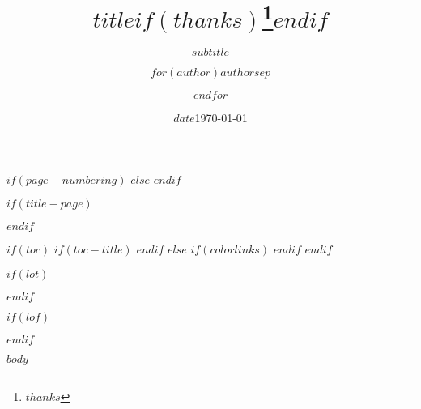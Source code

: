\documentclass[
$if(page-size)$
  $page-size$paper,
$else$
  a4paper,
$endif$
$if(fontsize)$
  $font-size$,
$else$
  10pt,
$endif$
$if(lang)$
  $babel-lang$,
$endif$
$if(draft)$
  draft,
$endif$
  parskip=half
]{scrartcl}
\title{$title$$if(thanks)$\thanks{$thanks$}$endif$}
\subtitle{$subtitle$}
\author{$for(author)$$author$$sep$ \and $endfor$}
\date{$date$}
\date{\today}
\begin{document}
$if(page-numbering)$
$else$
$endif$

$if(title-page)$
  \maketitle
  \pagebreak
$endif$

$if(toc)$
  $if(toc-title)$
    \renewcommand*\contentsname{$toc-title$}
  $endif$
$else$
{
  $if(colorlinks)$
    \hypersetup{linkcolor=$if(toccolor)$$toccolor$$else$$endif$}
  $endif$
  \setcounter{tocdepth}{$toc-depth$}
  \tableofcontents
  }
  \pagebreak
$endif$


$if(lot)$
\listoftables
$endif$

$if(lof)$
\listoffigures
$endif$

$body$
\end{document}
